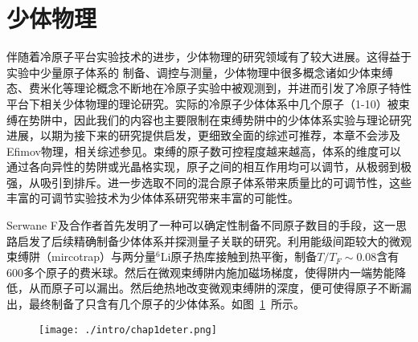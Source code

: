 \section{少体物理}\label{1sec:fewbody}
伴随着冷原子平台实验技术的进步，少体物理的研究领域有了较大进展。这得益于实验中少量原子体系的
制备、调控与测量，少体物理中很多概念诸如少体束缚态、费米化等理论概念不断地在冷原子实验中被观测到，并进而引发了冷原子特性平台下相关少体物理的理论研究。实际的冷原子少体体系中几个原子（1-10）被束缚在势阱中，因此我们的内容也主要限制在束缚势阱中的少体体系实验与理论研究进展，以期为接下来的研究提供启发，更细致全面的综述可推荐\cite{sowinski2019one,blume2012few}，本章不会涉及Efimov物理，相关综述参见\cite{nielsen2001three,braaten2006universality,KohlerMolFRRMP}。束缚的原子数可控程度越来越高，体系的维度可以通过各向异性的势阱或光晶格实现，原子之间的相互作用均可以调节，从极弱到极强，从吸引到排斥。进一步选取不同的混合原子体系带来质量比的可调节性，这些丰富的可调节实验技术为少体体系研究带来丰富的可能性。
\begin{comment}
实验中最早制备出费米子少体体系可以追溯到2005年，在较深的光晶格体系中,进入到莫特绝缘体区域，制备少体体系\cite{greiner2002quantum,EsslingerFermiSea,Esslinger1DMol,Esslinger3DMol,Ospelkaus3DMol,Hecker3DMol,SalaCIRMol}。如图~\ref{3dmol}~所示，
\begin{figure}[!htbp]
    \centering
    \texttt{[image: chap13dmol.png]}
    \bicaption{三维光晶格中的Feshbach分子态。散点代表不同晶格深度的实验数据。实线代表理论数据。摘自 \citep{Esslinger3DMol}}{The measured binding energy of molecules in a 3D optical lattice. Scatterd points for defferent depth of latice. The solid line for theory. Reprinted from \citep{Esslinger3DMol}}
    \label{3dmol}
\end{figure}
实验观测到了较深光晶格内调节磁场形成的Feshbach分子态。
\end{comment}

Serwane F及合作者首先发明了一种可以确定性制备不同原子数目的手段\cite{SerwaneDeterministic}，这一思路启发了后续精确制备少体体系并探测量子关联的研究\cite{zurn2012fermionization,WenzFermiSeaOnebyOne,Zurn2013Pairing,MurmannSpinChain,MurmannTwoFermionDoubleWell,RontaniTunneling}。利用能级间距较大的微观束缚阱（mircotrap）与两分量${}^6$Li原子热库接触到热平衡，制备$T/T_F\sim0.08$含有600多个原子的费米球。然后在微观束缚阱内施加磁场梯度，使得阱内一端势能降低，从而原子可以漏出。然后绝热地改变微观束缚阱的深度，便可使得原子不断漏出，最终制备了只含有几个原子的少体体系。如图~\ref{deter}~所示。
\begin{figure}[!htbp]
    \centering
    \texttt{[image: ./intro/chap1deter.png]}
    \label{deter}
\end{figure}

